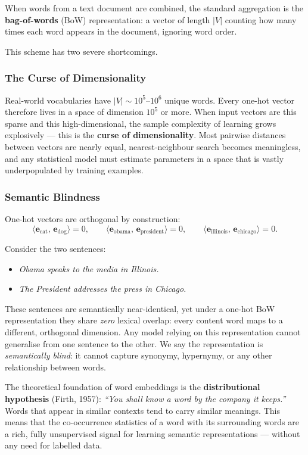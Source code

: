 \documentclass[11pt,a4paper]{article}
\newcommand{\term}[1]{\textcolor{DefGreen}{\textbf{#1}}}
\begin{document}
When words from a text document are combined, the standard aggregation is the \term{bag-of-words} (BoW) representation: a vector of length $|V|$ counting how many times each word appears in the document, ignoring word order.

This scheme has two severe shortcomings.

\subsubsection{The Curse of Dimensionality}

Real-world vocabularies have $|V| \sim 10^5$--$10^6$ unique words. Every one-hot vector therefore lives in a space of dimension $10^5$ or more. When input vectors are this sparse and this high-dimensional, the sample complexity of learning grows explosively — this is the \term{curse of dimensionality}. Most pairwise distances between vectors are nearly equal, nearest-neighbour search becomes meaningless, and any statistical model must estimate parameters in a space that is vastly underpopulated by training examples.

\subsubsection{Semantic Blindness}

One-hot vectors are orthogonal by construction:
\[
  \langle \mathbf{e}_{\text{cat}},\, \mathbf{e}_{\text{dog}} \rangle = 0, \qquad
  \langle \mathbf{e}_{\text{obama}},\, \mathbf{e}_{\text{president}} \rangle = 0, \qquad
  \langle \mathbf{e}_{\text{illinois}},\, \mathbf{e}_{\text{chicago}} \rangle = 0.
\]

Consider the two sentences:
\begin{itemize}
  \item \textit{Obama speaks to the media in Illinois.}
  \item \textit{The President addresses the press in Chicago.}
\end{itemize}

These sentences are semantically near-identical, yet under a one-hot BoW representation they share \emph{zero} lexical overlap: every content word maps to a different, orthogonal dimension. Any model relying on this representation cannot generalise from one sentence to the other. We say the representation is \emph{semantically blind}: it cannot capture synonymy, hypernymy, or any other relationship between words.

\begin{insightbox}
The theoretical foundation of word embeddings is the \term{distributional hypothesis} (Firth, 1957): \emph{``You shall know a word by the company it keeps.''} Words that appear in similar contexts tend to carry similar meanings. This means that the co-occurrence statistics of a word with its surrounding words are a rich, fully unsupervised signal for learning semantic representations — without any need for labelled data.
\end{insightbox}
\end{document}
